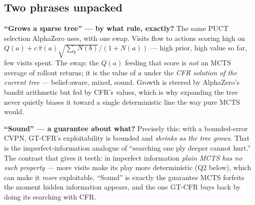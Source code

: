 \documentclass[11pt,a4paper]{article}
\begin{document}
\subsection{Two phrases unpacked}

\textbf{``Grows a sparse tree'' --- by what rule, exactly?} The same PUCT
selection AlphaZero uses, with one swap. Visits flow to actions scoring high on
$Q(a)+c\,\hat\pi(a)\sqrt{\sum_b N(b)}/(1+N(a))$ --- high prior, high value so far,
few visits spent. The swap: the $Q(a)$ feeding that score is \emph{not} an MCTS
average of rollout returns; it is the value of $a$ under the \emph{CFR solution of
the current tree} --- belief-aware, mixed, sound. Growth is steered by
AlphaZero's bandit arithmetic but fed by CFR's values, which is why expanding the
tree never quietly biases it toward a single deterministic line the way pure MCTS
would.

\textbf{``Sound'' --- a guarantee about what?} Precisely this: with a
bounded-error CVPN, GT-CFR's exploitability is bounded and \emph{shrinks as the
tree grows}. That is the imperfect-information analogue of ``searching one ply
deeper cannot hurt.'' The contrast that gives it teeth: in imperfect information
\emph{plain MCTS has no such property} --- more visits make its play more
deterministic (Q2 below), which can make it \emph{more} exploitable. ``Sound'' is
exactly the guarantee MCTS forfeits the moment hidden information appears, and the
one GT-CFR buys back by doing its searching with CFR.

\begin{center}
\end{center}
\end{document}

